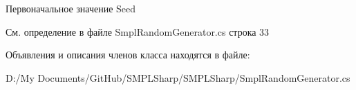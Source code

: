 Первоначальное значение Seed 



См. определение в файле Smpl\-Random\-Generator.\-cs строка 33



Объявления и описания членов класса находятся в файле\-:\begin{DoxyCompactItemize}
\item 
D\-:/\-My Documents/\-Git\-Hub/\-S\-M\-P\-L\-Sharp/\-S\-M\-P\-L\-Sharp/Smpl\-Random\-Generator.\-cs\end{DoxyCompactItemize}
